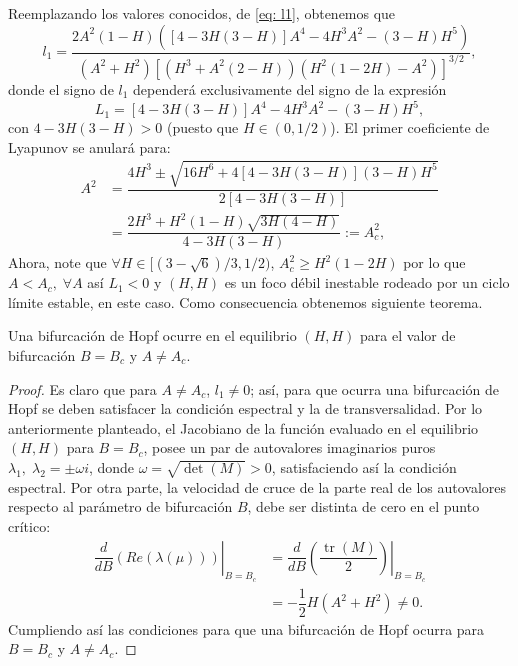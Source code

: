 \noindent Reemplazando los valores conocidos, de \eqref{eq: l1}, obtenemos que
\begin{equation}
	l_1 = \dfrac{2A^2(1 - H)([4 - 3H(3 - H)]A^4 -4H^3A^2 - (3 - H)H^5)}{(A^2 + H^2)[(H^3 + A^2(2 - H))(H^2(1 - 2H)- A^2)]^{3/2}},
	\label{eq: l1Kuznetsov}
\end{equation}
donde el signo de $l_1$ dependerá exclusivamente del signo de la expresión
\begin{equation}
	L_1 = [4 - 3H(3-H)]A^4 - 4H^3A^2 - (3-H)H^5,
	\label{eq: sgnL1}
\end{equation}
con $4 - 3H(3-H) > 0$ (puesto que $H \in (0, 1/2)$). El primer coeficiente de Lyapunov se anulará para:
\begin{equation*}
	\begin{aligned}
		A^2 &= \dfrac{4H^3 \pm \sqrt{16 H^6 + 4[4 - 3H(3-H)] (3-H)H^5}}{2 [4-3H(3-H)]} \\
		&= \dfrac{2H^3 + H^2(1 - H)\sqrt{3H(4 - H)}}{4-3H(3-H)} := A^2_c,
	\end{aligned}
	\label{eq: parametroBifHopfGeneralizada}
\end{equation*}
Ahora, note que $\forall H \in [(3 - \sqrt{6})/3, 1/2)$, $A_c^2 \geq H^2(1-2H)$ por lo que $A<A_c, \; \forall A$ así $L_1<0$ y $(H,H)$ es un foco débil inestable rodeado por un ciclo límite estable, en este caso. Como consecuencia obtenemos siguiente teorema.
\begin{teo}
	Una bifurcación de Hopf ocurre en el equilibrio $(H, H)$ para el valor de bifurcación $B = B_c$ y $A\neq A_c$.
	\label{teo:Hopf}
\end{teo}
\begin{proof}
	Es claro que para $A\neq A_c$, $l_1 \neq 0$; así, para que ocurra una bifurcación de Hopf se deben satisfacer la condición espectral y la de transversalidad. Por lo anteriormente planteado, el Jacobiano de la función evaluado en el equilibrio $(H, H)$ para $B = B_c$, posee un par de autovalores imaginarios puros $\lambda_1, \; \lambda_2 = \pm \omega i$, donde $\omega = \sqrt{\det (M)} > 0$, satisfaciendo así la condición espectral. Por otra parte, la velocidad de cruce de la parte real de los autovalores respecto al parámetro de bifurcación $B$, debe ser distinta de cero en el punto crítico:
	\begin{equation*}
		\begin{aligned}
			\left. \dfrac{d}{dB}(Re(\lambda(\mu))) \right|_{B=B_c} &= \left. \dfrac{d}{dB}\left(\dfrac{\operatorname{tr}(M)}{2}\right) \right|_{B=B_c} \\
			&= -\dfrac{1}{2}H(A^{2}+H^{2}) \neq 0.
		\end{aligned}
	\end{equation*}
	Cumpliendo así las condiciones para que una bifurcación de Hopf ocurra para $B = B_c$ y $A\neq A_c$.
\end{proof}

